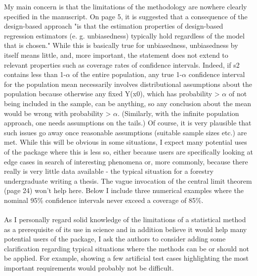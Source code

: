 \documentclass{article}
\begin{document}
My main concern is that the limitations of the methodology are nowhere clearly specified in the manuscript. On page 5, it is suggested that a consequence of the design-based approach "is that the estimation properties of design-based regression estimators (e. g. unbiasedness) typically hold regardless of the model that is chosen." While this is basically true for unbiasedness, unbiasedness by itself means little, and, more important, the statement does not extend to relevant properties such as coverage rates of confidence intervals. Indeed, if s2 contains less than 1-$\alpha$ of the entire population, any true 1-$\alpha$ confidence interval for the population mean necessarily involves distributional assumptions about the population because otherwise any fixed Y(x0), which has probability > $\alpha$ of not being included in the sample, can be anything, so any conclusion about the mean would be wrong with probability > $\alpha$. (Similarly, with the infinite population approach, one needs assumptions on the tails.) Of course, it is very plausible that such issues go away once reasonable assumptions (suitable sample sizes etc.) are met. While this will be obvious in some situations, I expect many potential uses of the package where this is less so, either because users are specifically looking at edge cases in search of interesting phenomena or, more commonly, because there really is very little data available - the typical situation for a forestry undergraduate writing a thesis. The vague invocation of the central limit theorem (page 24) won't help here. Below I include three numerical examples where the nominal 95\% confidence intervals never exceed a coverage of 85\%.\\

\\

As I personally regard solid knowledge of the limitations of a statistical method as a prerequisite of its use in science and in addition believe it would help many potential users of the package, I ask the authors to consider adding some clarification regarding typical situations where the methods can be or should not be applied. For example, showing a few artificial test cases highlighting the most important requirements would probably not be difficult.\\
\end{document}
